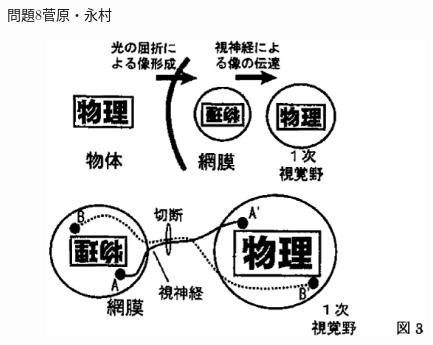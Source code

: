 \documentclass[fleqn]{jbook}
\begin{document}
\begin{question}{問題8}{菅原・永村}
\begin{enumerate}
\begin{figure}[htbp]
\begin{center}
\includegraphics[width=100mm]{2003phy8-3.eps}
\end{center}
\end{figure}

\end{enumerate}
\end{question}
\end{document}
